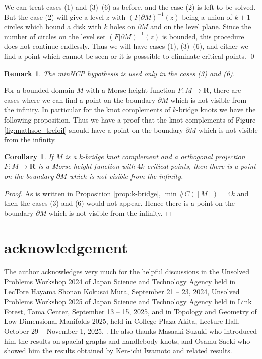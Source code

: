\documentclass{amsart}
\newtheorem{corollary}[theorem]{Corollary}
\newtheorem{remark}[theorem]{Remark}
\numberwithin{equation}{section}
\newcommand{\RR}{{\boldsymbol{R}}}
\newcommand{\lra}{\longrightarrow}
\newcommand{\bd}{\partial}
\begin{document}
We can treat cases (1) and (3)--(6) as before, and the case (2) is left to be solved. But the case (2) will give a level $z$ with $(F|\bd M)^{-1}(z)$ being a union of $k+1$ circles which bound a disk with $k$ holes on $\bd M$ and on the level plane.
Since the number of circles on the level set $(F|\bd M)^{-1}(z)$ is bounded, 
this procedure does not continue endlessly. Thus we will have cases (1), (3)--(6), and either we find a point which cannot be seen or it is posssible to eliminate critical points.
\hfill \qed\\

\begin{remark}
The minNCP hypothesis is used only in the cases (3) and (6).
\end{remark}

For a bounded domain $M$ with a Morse height function $F:M\lra \RR$,
there are cases where we can find  a point on the boundary $\bd M$ which is not visible from the infinity. In particular for the knot complements of $k$-bridge knots we have the following proposition. Thus we have a proof that the knot complements of Figure \ref{fig:mathsoc_trefoil} should have  a point on the boundary $\bd M$ which is not visible from the infinity.


\begin{corollary}\label{cor:k-bridge}
If $M$ is a $k$-bridge knot complement and a orthogonal projection $F:M\lra \RR$ is a Morse height function with $4k$ critical points, then there is a point on the boundary $\bd M$ which is not visible from the infinity. 
\end{corollary}
\begin{proof}
As is written in Proposition \ref{prop:k-bridge}, $\min\#C([M])=4k$ and then the cases (3) and (6) would not appear. Hence there is a point on the boundary $\bd M$ which is not visible from the infinity.
\end{proof}

\section*{acknowledgement}
The author acknowledges very much for the helpful discussions in the 
Unsolved Problems Workshop 2024 of Japan Science and Technology Agency held in LecTore Hayama Shonan Kokusai Mura, September 21 -- 23, 2024,  
Unsolved Problems Workshop 2025 of Japan Science and Technology Agency held in Link Forest, Tama Center, September 13 -- 15, 2025, and in Topology and Geometry of Low-Dimensional Manifolds 2025, held in College Plaza Akita, Lecture Hall, October 29 --  November 1, 2025.
.
He also thanks Masaaki Suzuki who introduced him the results on spacial graphs and handlebody knots, and Osamu Saeki who showed him the results obtained by Ken-ichi Iwamoto and related results.  
\end{document}
